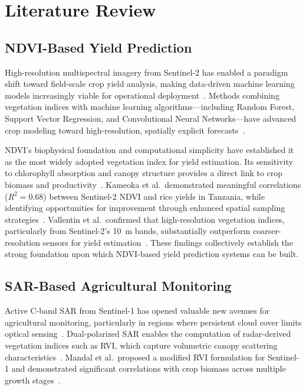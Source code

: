 \documentclass[conference]{IEEEtran}
\begin{document}
\section{Literature Review}

\subsection{NDVI-Based Yield Prediction}

High-resolution multispectral imagery from Sentinel-2 has enabled a paradigm
shift toward field-scale crop yield analysis, making data-driven machine
learning models increasingly viable for operational
deployment~\cite{narimani2026}. Methods combining vegetation indices with
machine learning algorithms---including Random Forest, Support Vector
Regression, and Convolutional Neural Networks---have advanced crop modeling
toward high-resolution, spatially explicit forecasts~\cite{narimani2026}.

NDVI's biophysical foundation and computational simplicity have established
it as the most widely adopted vegetation index for yield estimation. Its
sensitivity to chlorophyll absorption and canopy structure provides a direct
link to crop biomass and productivity~\cite{narimani2026,kameoka2025}.
Kameoka et al.\ demonstrated meaningful correlations ($R^2 = 0.68$) between
Sentinel-2 NDVI and rice yields in Tanzania, while identifying opportunities
for improvement through enhanced spatial sampling
strategies~\cite{kameoka2025}. Vallentin et al.\ confirmed that
high-resolution vegetation indices, particularly from Sentinel-2's
\SI{10}{\metre} bands, substantially outperform coarser-resolution sensors
for yield estimation~\cite{narimani2026}. These findings collectively
establish the strong foundation upon which NDVI-based yield prediction systems
can be built.

\subsection{SAR-Based Agricultural Monitoring}

Active C-band SAR from Sentinel-1 has opened valuable new avenues for
agricultural monitoring, particularly in regions where persistent cloud cover
limits optical sensing~\cite{esa2022}. Dual-polarized SAR enables the
computation of radar-derived vegetation indices such as RVI, which capture
volumetric canopy scattering characteristics~\cite{mandal2020}. Mandal
et al.\ proposed a modified RVI formulation for Sentinel-1 and demonstrated
significant correlations with crop biomass across multiple growth
stages~\cite{mandal2020}.
\end{document}
